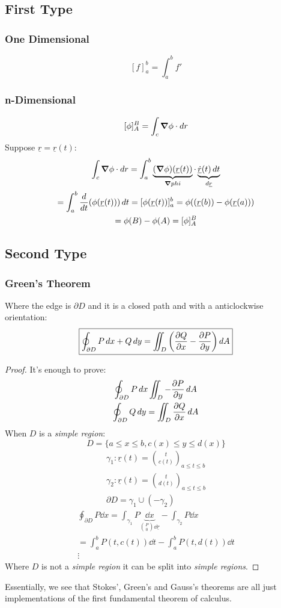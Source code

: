 \documentclass[00_complete]{subfiles}
\begin{document}
\subsection{First Type}
\subsubsection{One Dimensional}
$$[f]_a^b=\int_{a}^{b}f'$$
\subsubsection{n-Dimensional}
$$[\phi]_A^B=\int_c\grad\phi\cdot \dd{r}$$
Suppose $\underline r = \underline r(t)$:
\begin{gather*}
    \int_c\grad \phi \cdot \dd{r} = \int_{a}^{b}\underbrace{(\grad
    \phi)(\underline r(t))}_{\grad phi}\cdot\underbrace{\underline{\dot
r}(t)\dd{t}}_{\dd{\underline r}} \\
= \int_{a}^{b}\frac{\dd}{\dd{t}}(\phi(\underline r(t)))\dd{t} =
[\phi(\underline r (t))]_a^b = \phi((\underline r(b))-\phi(\underline r(a))) \\
=\phi(B)-\phi(A)=[\phi]_A^B
\end{gather*}
\subsection{Second Type}
\subsubsection{Green's Theorem}
Where the edge is $\partial D$ and it is a closed path and with a
anticlockwise orientation:
$$\boxed{\oint_{\partial D}P\dd{x}+Q\dd{y} = \iint_D
\left(\pdv{Q}{x}-\pdv{P}{y}\right)\dd{A}}$$
\begin{proof}
    It's enough to prove:
    \begin{gather*}
        \oint_{\partial D}P \dd{x} \iint_D-\pdv{P}{y}\dd{A} \\
        \oint_{\partial D}Q \dd{y}= \iint_D\pdv{Q}{x}\dd{A}
    \end{gather*}
When $D$ is a \emph{simple region}:
$$D=\{a\leq x \leq b, c(x) \leq y \leq d(x)\}$$
\begin{gather*}
    \gamma_1:\underline r(t)=\binom{t}{c(t)}_{a \leq t \leq b} \\
    \gamma_2:\underline r(t)=\binom{t}{d(t)}_{a \leq t \leq b} \\
    \partial D = \gamma_1 \cup (-\gamma_2)
\end{gather*}
\begin{gather*}
    \oint_{\partial D}P \dd{x}=
    \int_{\gamma_1}P\underbrace{\dd{x}}_{\binom{P}{0}\dd{\underline r}} -
    \int_{\gamma_2}P\dd{x} \\
    =\int_{a}^{b}P(t,c(t))\dd{t}-\int_{a}^{b}P(t,d(t))\dd{t} \\
    \vdots
\end{gather*}
Where $D$ is not a \emph{simple region} it can be split into \emph{simple
regions}.
\end{proof}
Essentially, we see that Stokes', Green's and Gauss's theorems are all just
implementations of the first fundamental theorem of calculus.
\end{document}
